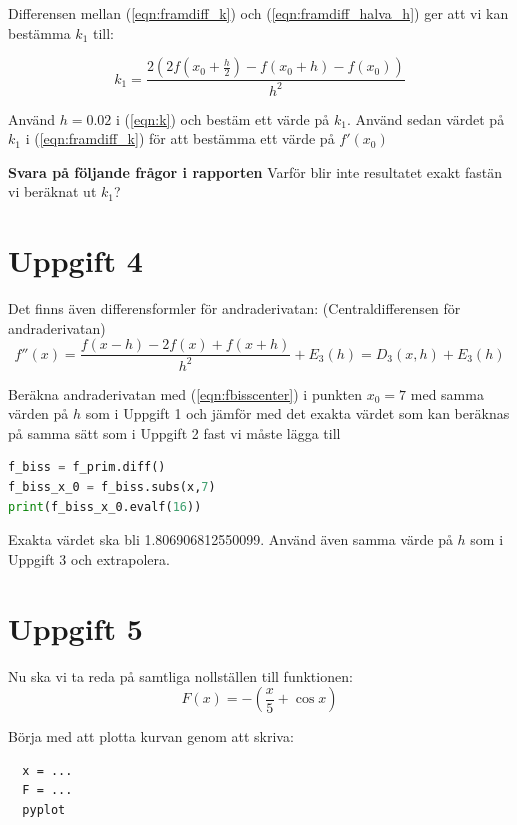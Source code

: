 \documentclass[a4paper]{article}
\begin{document}
Differensen mellan (\ref{eqn:framdiff_k}) och (\ref{eqn:framdiff_halva_h}) ger att vi kan bestämma \( k_1 \) till:

\begin{equation} \label{eqn:k}
k_1=\frac{2\left(2f\left(x_0+\frac{h}{2}\right)-f\left(x_0+h\right)-f\left(x_0\right)\right)}{h^2}
\end{equation}

Använd \( h=0.02 \) i (\ref{eqn:k}) och bestäm ett värde på \( k_1 \). Använd sedan värdet på \( k_1 \) i (\ref{eqn:framdiff_k})
för att bestämma ett värde på \( f'(x_0) \)

\textbf{Svara på följande frågor i rapporten}
Varför blir inte resultatet exakt fastän vi beräknat ut \( k_1 \)?

\section{Uppgift 4}
Det finns även differensformler för andraderivatan: (Centraldifferensen för andraderivatan)
\begin{equation} \label{eqn:fbisscenter}
    f''(x)=\frac{f(x-h)-2f(x)+f(x+h)}{h^2}+E_3(h)=D_3(x,h)+E_3(h)
\end{equation}

Beräkna andraderivatan med (\ref{eqn:fbisscenter}) i punkten \( x_0=7 \)  med samma värden på
\( h  \)  som i Uppgift 1 och jämför med det exakta värdet som kan beräknas på samma sätt som 
i Uppgift 2 fast vi måste lägga till 

\begin{lstlisting}[language=Python]
f_biss = f_prim.diff()
f_biss_x_0 = f_biss.subs(x,7)
print(f_biss_x_0.evalf(16))
\end{lstlisting}

Exakta värdet ska bli 1.806906812550099. Använd även samma värde på \(h\)  som i Uppgift 3
och extrapolera.

\newpage
\section{Uppgift 5}
Nu ska vi ta reda på samtliga nollställen till funktionen:
\begin{equation} \label{eqn:F}
F(x)=-\left(\frac{x}{5}+\cos x\right)
\end{equation}

Börja med att plotta kurvan genom att skriva:
\begin{lstlisting}
  x = ... 
  F = ... 
  pyplot 
\end{lstlisting}
\end{document}
